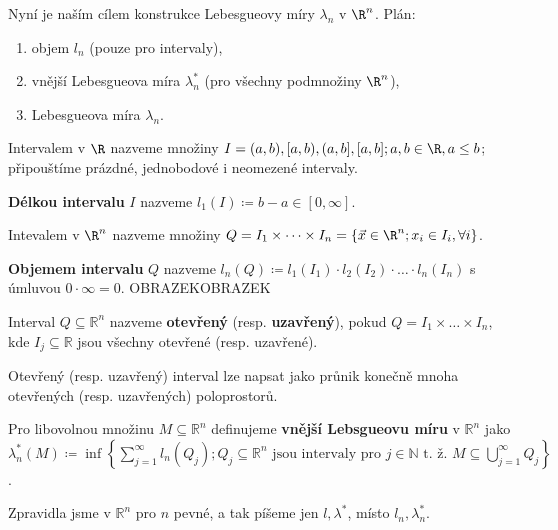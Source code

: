 \begin{poznamka}
    Nyní je naším cílem konstrukce Lebesgueovy míry $\lambda_n$ v $\R^n$.
    Plán:
    \begin{enumerate}[1.]
        \item objem $l_n$ (pouze pro intervaly),
        \item vnější Lebesgueova míra $\lambda^*_n$ (pro všechny podmnožiny $\R^n$),
        \item Lebesgueova míra $\lambda_n$.
    \end{enumerate}
\end{poznamka}

\begin{definice}
    Intervalem v $\R$ nazveme množiny $I = (a, b), [a, b), (a,b], [a,b]; a, b \in \R, a\leq b$; připouštíme prázdné, jednobodové i neomezené intervaly.

    \textbf{Délkou intervalu} $I$ nazveme $l_1(I) \coloneq b-a\in[0, \infty]$.

    Intevalem v $\R^n$ nazveme množiny $Q=I_1 \times \dots \times I_n = \left\{\vec x \in \R^n;x_i \in I_i, \forall i\right\}$.

    \textbf{Objemem intervalu} $Q$ nazveme $l_n(Q)\coloneq l_1(I_1)\cdot l_2(I_2)\cdot\dots\cdot l_n(I_n)$ s úmluvou $0\cdot\infty = 0$.
    OBRAZEKOBRAZEK

    Interval $Q\subseteq \mathbb R^n$ nazveme \textbf{otevřený} (resp. \textbf{uzavřený}), pokud $Q = I_1\times\dots\times I_n$, kde $I_j \subseteq \mathbb R$ jsou všechny otevřené (resp. uzavřené).
\end{definice}

\begin{poznamka}
    Otevřený (resp. uzavřený) interval lze napsat jako průnik konečně mnoha
otevřených (resp. uzavřených) poloprostorů.
\end{poznamka}

\begin{definice}
    Pro libovolnou množinu $M \subseteq \mathbb R^n$ definujeme \textbf{vnější Lebsgueovu míru} v $\mathbb R^n$ jako $\lambda_n^*(M)\coloneq \inf\left\{\sum_{j=1}^{\infty}l_n(Q_j); Q_j \subseteq \mathbb R^n \text{ jsou intervaly pro } j \in \mathbb N \text{ t. ž. } M\subseteq \bigcup_{j=1}^\infty Q_j\right\}$.
\end{definice}

\begin{poznamka}
    Zpravidla jsme v $\mathbb R^n$ pro $n$ pevné, a tak píšeme jen $l, \lambda^*$, místo $l_n, \lambda_n^*$.
\end{poznamka}

